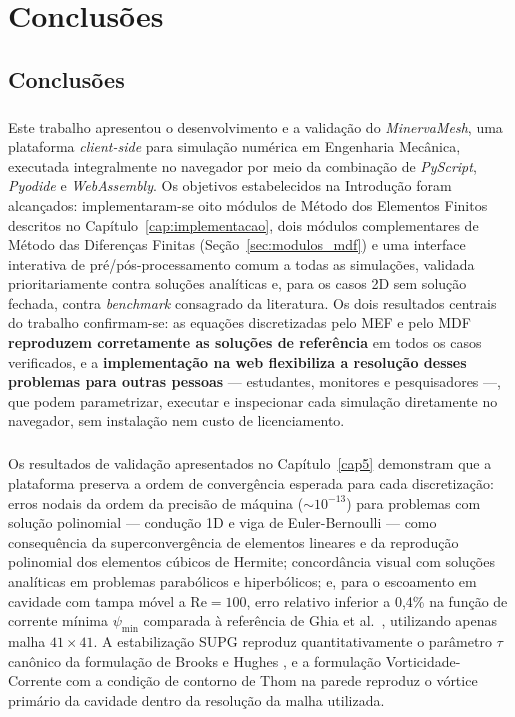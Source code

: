 \chapter{Conclusões}
\label{cap6}

\section{Conclusões}
\label{sec:conclusao}

\paragraph{}Este trabalho apresentou o desenvolvimento e a validação do \textit{MinervaMesh}, uma plataforma \textit{client-side} para simulação numérica em Engenharia Mecânica, executada integralmente no navegador por meio da combinação de \textit{PyScript}, \textit{Pyodide} e \textit{WebAssembly}. Os objetivos estabelecidos na Introdução foram alcançados: implementaram-se oito módulos de Método dos Elementos Finitos descritos no Capítulo~\ref{cap:implementacao}, dois módulos complementares de Método das Diferenças Finitas (Seção~\ref{sec:modulos_mdf}) e uma interface interativa de pré/pós-processamento comum a todas as simulações, validada prioritariamente contra soluções analíticas e, para os casos 2D sem solução fechada, contra \textit{benchmark} consagrado da literatura. Os dois resultados centrais do trabalho confirmam-se: as equações discretizadas pelo MEF e pelo MDF \textbf{reproduzem corretamente as soluções de referência} em todos os casos verificados, e a \textbf{implementação na web flexibiliza a resolução desses problemas para outras pessoas} --- estudantes, monitores e pesquisadores ---, que podem parametrizar, executar e inspecionar cada simulação diretamente no navegador, sem instalação nem custo de licenciamento.

\paragraph{}Os resultados de validação apresentados no Capítulo~\ref{cap5} demonstram que a plataforma preserva a ordem de convergência esperada para cada discretização: erros nodais da ordem da precisão de máquina ($\sim 10^{-13}$) para problemas com solução polinomial --- condução 1D e viga de Euler-Bernoulli --- como consequência da superconvergência de elementos lineares e da reprodução polinomial dos elementos cúbicos de Hermite; concordância visual com soluções analíticas em problemas parabólicos e hiperbólicos; e, para o escoamento em cavidade com tampa móvel a $\text{Re}=100$, erro relativo inferior a 0,4\% na função de corrente mínima $\psi_{\min}$ comparada à referência de Ghia et al.\ \cite{Ghia1982}, utilizando apenas malha $41 \times 41$. A estabilização SUPG reproduz quantitativamente o parâmetro $\tau$ canônico da formulação de Brooks e Hughes \cite{Brooks1982}, e a formulação Vorticidade-Corrente com a condição de contorno de Thom \cite{Thom1933} na parede reproduz o vórtice primário da cavidade dentro da resolução da malha utilizada.

